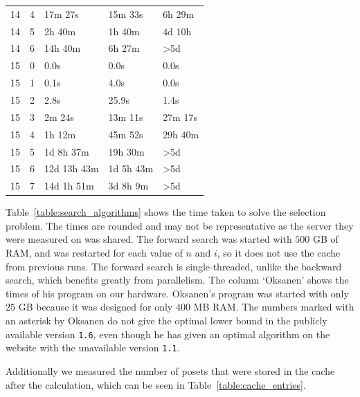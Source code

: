 \documentclass[10pt,journal,compsoc]{IEEEtran}
\begin{document}
\begin{table}[!t]
\begin{tabular}{c|c|l|l|l}
    14  & 4   & 17m 27s                 & 15m 33s                  & 6h 29m           \\
    14  & 5   & 2h 40m                  & 1h 40m                   & 4d 10h           \\
    14  & 6   & 14h 40m                 & 6h 27m                   & >5d              \\
    \hline
    15  & 0   & 0.0s                    & 0.0s                     & 0.0s             \\
    15  & 1   & 0.1s                    & 4.0s                     & 0.0s             \\
    15  & 2   & 2.8s                    & 25.9s                    & 1.4s             \\
    15  & 3   & 2m 24s                  & 13m 11s                  & 27m 17s          \\
    15  & 4   & 1h 12m                  & 45m 52s                  & 29h 40m          \\
    15  & 5   & 1d 8h 37m               & 19h 30m                  & >5d              \\
    15  & 6   & 12d 13h 43m             & 1d 5h 43m                & >5d              \\
    15  & 7   & 14d 1h 51m              & 3d 8h 9m                 & >5d              \\
  \end{tabular}
\end{table}

Table~\ref{table:search_algorithms} shows the time taken to solve the selection problem.
The times are rounded and may not be representative as the server they were measured on was shared.
The forward search was started with $500$ GB of RAM, and was restarted for each value of $n$ and $i$, so it does not use the cache from previous runs.
The forward search is single-threaded, unlike the backward search, which benefits greatly from parallelism.
The column `Oksanen' shows the times of his program \cite{Oksanen} on our hardware.
Oksanen's program was started with only $25$ GB because it was designed for only $400$ MB RAM.
The numbers marked with an asterisk by Oksanen do not give the optimal lower bound in the publicly available version \texttt{1.6}, even though he has given an optimal algorithm on the website with the unavailable version \texttt{1.1}.

Additionally we measured the number of posets that were stored in the cache after the calculation, which can be seen in Table~\ref{table:cache_entries}.
\end{document}
